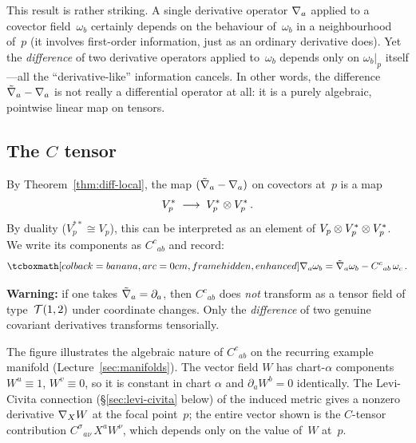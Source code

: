 \begin{remark}
  This result is rather striking.  A single derivative operator
  $\nabla_a$ applied to a covector field~$\omega_b$ certainly
  depends on the behaviour of~$\omega_b$ in a neighbourhood
  of~$p$ (it involves first-order information, just as an
  ordinary derivative does).  Yet the \emph{difference} of two
  derivative operators applied to~$\omega_b$ depends only on
  $\omega_b|_p$ itself---all the ``derivative-like'' information
  cancels.  In other words, the difference
  $\tilde{\nabla}_a - \nabla_a$ is not really a differential operator
  at all: it is a purely algebraic, pointwise linear map on
  tensors.
\end{remark}

\subsection{The $C$ tensor}\label{sec:C-tensor}

By Theorem~\ref{thm:diff-local}, the map
$(\tilde{\nabla}_a - \nabla_a)$ on covectors at~$p$ is a map
\[
  V_p^* \;\longrightarrow\; V_p^*\otimes V_p^*\,.
\]
By duality ($V_p^{**}\cong V_p$), this can be interpreted as an
element of $V_p\otimes V_p^*\otimes V_p^*$.  We write its components as
$C^c{}_{ab}$ and record:
\begin{equation}\label{eq:C-tensor-covector}
  \eqbox{\covd_a\omega_b
    = \tilde\covd_a\omega_b - C^c{}_{ab}\,\omega_c}\,.
\end{equation}

\begin{remark}
  \textbf{Warning:} if one takes $\tilde{\nabla}_a = \partial_a$,
  then $C^c{}_{ab}$ does \emph{not} transform as a tensor field
  of type~$\mathcal{T}(1,2)$ under coordinate changes.  Only the
  \emph{difference} of two genuine covariant derivatives
  transforms tensorially.
\end{remark}



\noindent
The figure illustrates the algebraic nature of $C^c{}_{ab}$ on
the recurring example manifold (Lecture~\ref{sec:manifolds}).  The vector
field $W$ has chart-$\alpha$ components $W^u\equiv 1$, $W^v\equiv
0$, so it is constant in chart $\alpha$ and $\partial_a W^b = 0$
identically.  The Levi-Civita connection
(\S\ref{sec:levi-civita} below) of the induced metric gives a
nonzero derivative $\nabla_X W$ at the focal point~$p$;
the entire vector shown is the $C$-tensor contribution
$C^\sigma{}_{a\nu}\,X^a W^\nu$, which depends only on the value
of~$W$ at~$p$.

